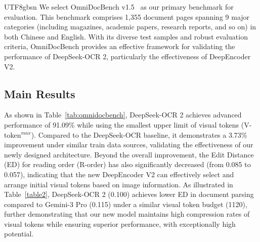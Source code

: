 \documentclass[11pt, a4paper, logo, copyright, nonumbering]{deepseek}
\begin{document}
\begin{CJK*}{UTF8}{gbsn}
We select OmniDocBench v1.5~\cite{ouyang2025omnidocbench} as our primary benchmark for evaluation. This benchmark comprises 1,355 document pages spanning 9 major categories (including magazines, academic papers, research reports, and so on) in both Chinese and English. With its diverse test samples and robust evaluation criteria, OmniDocBench provides an effective framework for validating the performance of DeepSeek-OCR 2, particularly the effectiveness of DeepEncoder V2.



\subsection{Main Results}
\label{OmniDocbench v1.5}

As shown in Table~\ref{tab:omnidocbench}, DeepSeek-OCR 2 achieves advanced performance of 91.09\% while using the smallest upper limit of visual tokens (V-token$^{max}$). Compared to the DeepSeek-OCR baseline, it demonstrates a 3.73\% improvement under similar train data sources, validating the effectiveness of our newly designed architecture. Beyond the overall improvement, the Edit Distance (ED) for reading order (R-order) has also significantly decreased (from 0.085 to 0.057), indicating that the new DeepEncoder V2 can effectively select and arrange initial visual tokens based on image information. As illustrated in Table~\ref{table2}, DeepSeek-OCR 2 (0.100) achieves lower ED in document parsing compared to Gemini-3 Pro (0.115) under a similar visual token budget (1120), further demonstrating that our new model maintains high compression rates of visual tokens while ensuring superior performance, with exceptionally high potential.

\begin{table}[!t]\small
	\centering	
        
 	\caption{Edit Distances for different categories of document-elements in OmniDocBench v1.5. V-token$^{max}$ denotes the lowest maximum number of visual tokens.}
    \setlength{\abovecaptionskip}{0.2cm}
\end{table}
\end{CJK*}
\end{document}
